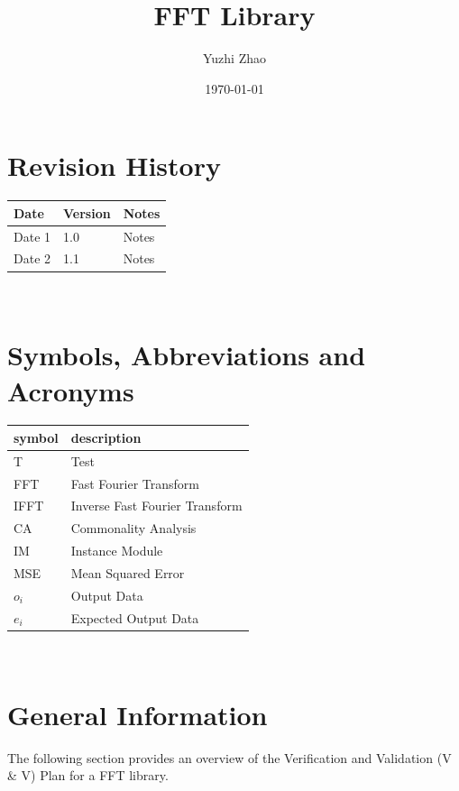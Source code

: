 \documentclass[12pt, titlepage]{article}
\begin{document}
\title{FFT Library} 
\author{Yuzhi Zhao}
\date{\today}
	
\maketitle


\section{Revision History}

\begin{tabularx}{\textwidth}{p{3cm}p{2cm}X}
\toprule {\bf Date} & {\bf Version} & {\bf Notes}\\
\midrule
Date 1 & 1.0 & Notes\\
Date 2 & 1.1 & Notes\\
\bottomrule
\end{tabularx}

~\newpage

\section{Symbols, Abbreviations and Acronyms}

\renewcommand{\arraystretch}{1.2}
\begin{tabular}{l l} 
  \toprule		
  \textbf{symbol} & \textbf{description}\\
  \midrule 
  T & Test\\
  FFT & Fast Fourier Transform\\
IFFT & Inverse Fast Fourier Transform\\
CA & Commonality Analysis\\
IM & Instance Module\\
MSE & Mean Squared Error\\
$o_i $ & Output Data\\
$e_i$ & Expected Output Data\\
  \bottomrule
\end{tabular}\\

\newpage

\tableofcontents

\listoftables

\listoffigures

\newpage



\section{General Information}
The following section provides an overview of the Verification and Validation (V \& V) Plan for a FFT library.
\end{document}
